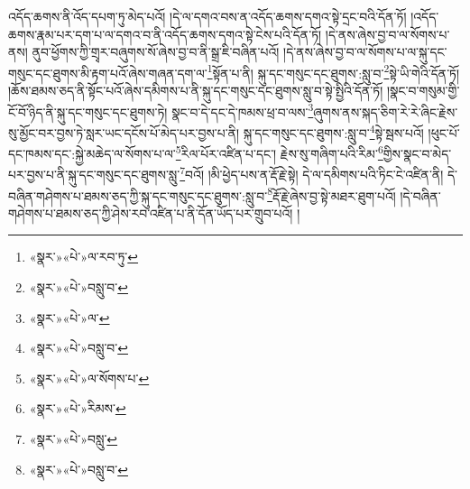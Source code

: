 འདོད་ཆགས་ནི་འོད་དཔག་ཏུ་མེད་པའོ། །དེ་ལ་དགའ་བས་ན་འདོད་ཆགས་དགའ་སྟེ་དྲང་བའི་དོན་ཏོ། །འདོད་ཆགས་རྣམ་པར་དག་པ་ལ་དགའ་བ་ནི་འདོད་ཆགས་དགའ་སྟེ་ངེས་པའི་དོན་ཏོ། །དེ་ནས་ཞེས་བྱ་བ་ལ་སོགས་པ་ནས། ནུབ་ཕྱོགས་ཀྱི་གྲྭར་བཞུགས་སོ་ཞེས་བྱ་བ་ནི་སྒྲ་ཇི་བཞིན་པའོ། །དེ་ནས་ཞེས་བྱ་བ་ལ་སོགས་པ་ལ་སྐུ་དང་གསུང་དང་ཐུགས་མི་རྟག་པའོ་ཞེས་གཞན་དག་ལ་\footnote{«སྣར་»«པེ་»ལ་རབ་ཏུ་}སྟོན་པ་ནི། སྐུ་དང་གསུང་དང་ཐུགས་:སླུ་བ་\footnote{«སྣར་»«པེ་»བསླུ་བ་}སྟེ་ཡི་གེའི་དོན་ཏོ། །ཆོས་ཐམས་ཅད་ནི་སྟོང་པའོ་ཞེས་དམིགས་པ་ནི་སྐུ་དང་གསུང་དང་ཐུགས་སླུ་བ་སྟེ་སྤྱིའི་དོན་ཏོ། །སྣང་བ་གསུམ་གྱི་ངོ་བོ་ཉིད་ནི་སྐུ་དང་གསུང་དང་ཐུགས་ཏེ། སྣང་བ་དེ་དང་དེ་ཁམས་ཕྲ་བ་ལས་\footnote{«སྣར་»«པེ་»ལ་}ཞུགས་ནས་སྐད་ཅིག་རེ་རེ་ཞིང་རྗེས་སུ་མྱོང་བར་བྱས་ཏེ་སླར་ཡང་དངོས་པོ་མེད་པར་བྱས་པ་ནི། སྐུ་དང་གསུང་དང་ཐུགས་:སླུ་བ་\footnote{«སྣར་»«པེ་»བསླུ་བ་}སྟེ་སྦས་པའོ། །ཕུང་པོ་དང་ཁམས་དང་:སྐྱེ་མཆེད་ལ་སོགས་པ་ལ་\footnote{«སྣར་»«པེ་»ལ་སོགས་པ་}རིལ་པོར་འཛིན་པ་དང་། རྗེས་སུ་གཞིག་པའི་རིམ་\footnote{«སྣར་»«པེ་»རིམས་}གྱིས་སྣང་བ་མེད་པར་བྱས་པ་ནི་སྐུ་དང་གསུང་དང་ཐུགས་སླུ་\footnote{«སྣར་»«པེ་»བསླུ་}བའོ། །མི་ཕྱེད་པས་ན་རྡོ་རྗེ་སྟེ། དེ་ལ་དམིགས་པའི་ཏིང་ངེ་འཛིན་ནི། དེ་བཞིན་གཤེགས་པ་ཐམས་ཅད་ཀྱི་སྐུ་དང་གསུང་དང་ཐུགས་:སླུ་བ་\footnote{«སྣར་»«པེ་»བསླུ་བ་}རྡོ་རྗེ་ཞེས་བྱ་སྟེ་མཐར་ཐུག་པའོ། །དེ་བཞིན་གཤེགས་པ་ཐམས་ཅད་ཀྱི་ཤེས་རབ་འཛིན་པ་ནི་དོན་ཡོད་པར་གྲུབ་པའོ། །
